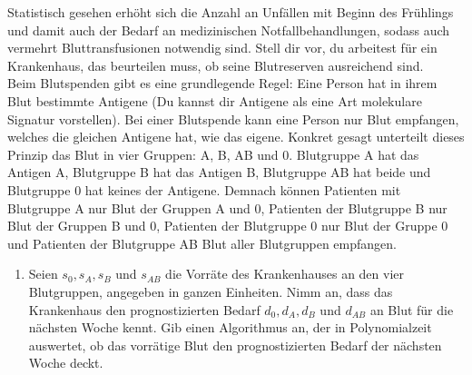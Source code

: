 \documentclass{uebung_cs}
\begin{document}
\begin{aufgabe}
\begin{figure}[ht]
\begin{minipage}[b]{0.5\textwidth}
    	
    	\end{minipage}
    \end{figure}
\end{aufgabe}

\begin{aufgabe}[Blutspende]
    Statistisch gesehen erhöht sich die Anzahl an Unfällen mit Beginn des Frühlings und damit auch der Bedarf an medizinischen Notfallbehandlungen, sodass auch vermehrt Bluttransfusionen notwendig sind. Stell dir vor, du arbeitest für ein Krankenhaus, das beurteilen muss, ob seine Blutreserven ausreichend sind.\\
    Beim Blutspenden gibt es eine grundlegende Regel: Eine Person hat in ihrem Blut bestimmte Antigene (Du kannst dir Antigene als eine Art molekulare Signatur vorstellen). Bei einer Blutspende kann eine Person nur Blut empfangen, welches die gleichen Antigene hat, wie das eigene. Konkret gesagt unterteilt dieses Prinzip das Blut in vier Gruppen: A, B, AB und 0. Blutgruppe A hat das Antigen A, Blutgruppe B hat das Antigen B, Blutgruppe AB hat beide und Blutgruppe 0 hat keines der Antigene. Demnach können Patienten mit Blutgruppe A nur Blut der Gruppen A und 0, Patienten der Blutgruppe B nur Blut der Gruppen B und 0, Patienten der Blutgruppe 0 nur Blut der Gruppe 0 und Patienten der Blutgruppe AB Blut aller Blutgruppen empfangen.
    \begin{enumerate}
    	\item Seien $s_0,s_A,s_B$ und $s_{AB}$ die Vorräte des Krankenhauses an den vier Blutgruppen, angegeben in ganzen Einheiten. Nimm an, dass das Krankenhaus den prognostizierten Bedarf $d_0, d_A,d_B$ und $d_{AB}$ an Blut für die nächsten Woche kennt. Gib einen Algorithmus an, der in Polynomialzeit auswertet, ob das vorrätige Blut den prognostizierten Bedarf der nächsten Woche deckt.\\

\end{enumerate}
\end{aufgabe}
\end{document}
